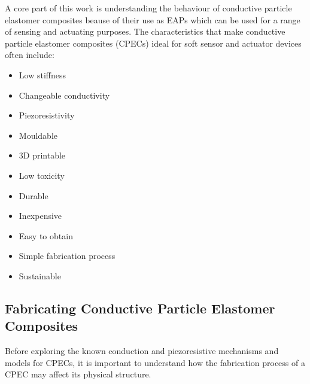 A core part of this work is understanding the behaviour of conductive particle elastomer composites beause of their use as EAPs which can be used for a range of sensing and actuating purposes. The characteristics that make conductive particle elastomer composites (CPECs) ideal for soft sensor and actuator devices often include:
\begin{itemize}
    \item Low stiffness
    \item Changeable conductivity
    \item Piezoresistivity
    \item Mouldable
    \item 3D printable
    \item Low toxicity
    \item Durable
    \item Inexpensive
    \item Easy to obtain
    \item Simple fabrication process
    \item Sustainable
\end{itemize}

\subsection{Fabricating Conductive Particle Elastomer Composites}
\label{sec:Fabricating Conductive Particle Elastomer Composites}
Before exploring the known conduction and piezoresistive mechanisms and models for CPECs, it is important to understand how the fabrication process of a CPEC may affect its physical structure. 

